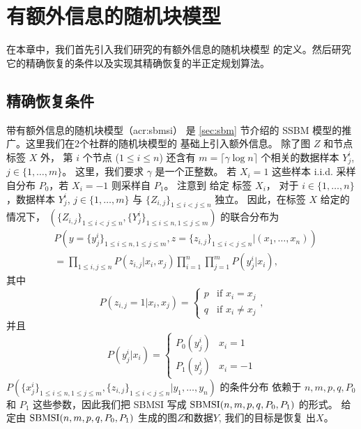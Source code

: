 \chapter{有额外信息的随机块模型}
\label{chap:sbmsi}
在本章中，我们首先引入我们研究的有额外信息的随机块模型
的定义。然后研究它的精确恢复的条件以及实现其精确恢复的半正定规划算法。

\section{精确恢复条件}
\label{sec:sbmsi_exact_recovery_condtion}
带有额外信息的随机块模型（\gls{acr:sbmsi}）
是 \ref{sec:sbm} 节介绍的
SSBM 模型的推广。这里我们在2个社群的随机块模型的
基础上引入额外信息。
除了图 $Z$ 和节点标签 $X$ 外，
第 $i$  个节点 ($1\leq i \leq n$) 
还含有 $m=\lceil \gamma \log n \rceil $ 个相关的数据样本 
$Y^{i}_{j}$, $j\in \{1,\ldots,m\}$。
这里，我们要求 $\gamma$ 是一个正整数。
若 $X_i=1$
这些样本 i.i.d. 采样自分布 $P_0$，若  $X_i=-1$ 则采样自 $P_1$。
注意到 给定 标签 $X_i$，
对于 $i\in\{1,\ldots,n\}$，数据样本 $Y^{i}_{j}$, $j\in \{1,\ldots,m\}$ 与 $\{Z_{i,j}\}_{1\le i<j\le n}$ 独立。
 因此，在标签 $X$ 给定的情况下，
  $(\{Z_{i,j}\}_{1\le i<j\le n},\{Y^i_{j}\}_{1\le i\le n,1\le j\le m})$ 的联合分布为  
\begin{align}\label{eq:lh}
    &P(y=\{y^i_{j}\}_{1\le i\le n,1\le j\le m},z=\{z_{i,j}\}_{1\le i<j\le n}| (x_1,\ldots,x_n)) \nonumber\\
    &= \prod_{1\le i,j\le n}P(z_{i,j}|x_i,x_j)\prod_{i=1}^n \prod_{j=1}^m P(y^i_j|x_i), 
\end{align}
其中 
\begin{equation*}
    P  (z_{i,j}=1|x_i,x_j) = \begin{cases}
        p & \text{if } x_i = x_j \\
        q & \text{if } x_i\ne x_j
    \end{cases},
\end{equation*}
并且
\begin{equation*}
    P(y^i_j|x_i) = \begin{cases}
        P_0(y^i_j) & x_i = 1 \\
        P_1(y^i_j) & x_i = -1
    \end{cases}
\end{equation*}
 $P(\{x^i_{j}\}_{1\le i\le n,1\le j\le m},\{z_{i,j}\}_{1\le i<j\le n}| y_1,\ldots,y_n)$ 
 的条件分布 依赖于
 $n,m,p, q, P_0$ 和 $P_1$ 这些参数，因此我们把 SBMSI 写成 $\operatorname{SBMSI}(n,m,p,q,P_0,P_1)$ 的形式。
 给定由 $\operatorname{SBMSI}(n,m,p,q,P_0,P_1)$ 生成的图$Z$和数据$Y$, 我们的目标是恢复 出$X$。
 
